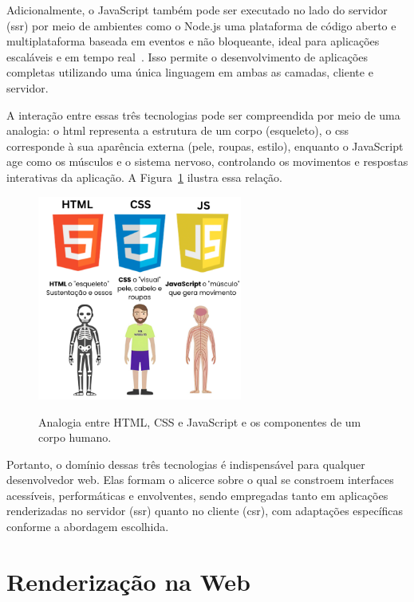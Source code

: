 Adicionalmente, o JavaScript também pode ser executado no lado do servidor (\acrshort{ssr}) por meio de ambientes como o Node.js uma plataforma de código aberto e multiplataforma baseada em eventos e não bloqueante, ideal para aplicações escaláveis e em tempo real~\cite{nodejs2025, js2025}. Isso permite o desenvolvimento de aplicações completas utilizando uma única linguagem em ambas as camadas, cliente e servidor.

A interação entre essas três tecnologias pode ser compreendida por meio de uma analogia: o \acrshort{html} representa a estrutura de um corpo (esqueleto), o \acrshort{css} corresponde à sua aparência externa (pele, roupas, estilo), enquanto o JavaScript age como os músculos e o sistema nervoso, controlando os movimentos e respostas interativas da aplicação. A Figura~\ref{fig:html-css-js} ilustra essa relação.

\begin{figure}[H]
  \centering
  \caption{Analogia entre HTML, CSS e JavaScript e os componentes de um corpo humano.}
  \includegraphics[width=0.6\textwidth]{media/html_css_js_analogia.png}
  \label{fig:html-css-js}
\end{figure}

Portanto, o domínio dessas três tecnologias é indispensável para qualquer desenvolvedor web. Elas formam o alicerce sobre o qual se constroem interfaces acessíveis, performáticas e envolventes, sendo empregadas tanto em aplicações renderizadas no servidor (\acrshort{ssr}) quanto no cliente (\acrshort{csr}), com adaptações específicas conforme a abordagem escolhida.



\section{Renderização na Web}
\label{sec:renderizacao-web}

